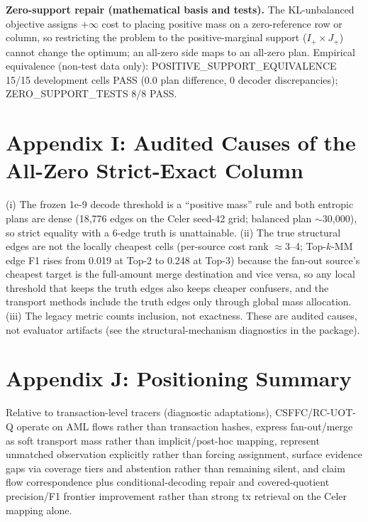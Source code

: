 \documentclass[journal]{IEEEtran}
\begin{document}
\textbf{Zero-support repair (mathematical basis and tests).} The KL-unbalanced objective assigns $+\infty$ cost to placing positive mass on a zero-reference row or column, so restricting the problem to the positive-marginal support ($I_+\times J_+$) cannot change the optimum; an all-zero side maps to an all-zero plan. Empirical equivalence (non-test data only): POSITIVE\_SUPPORT\_EQUIVALENCE 15/15 development cells PASS (0.0 plan difference, 0 decoder discrepancies); ZERO\_SUPPORT\_TESTS 8/8 PASS.

\section*{Appendix I: Audited Causes of the All-Zero Strict-Exact Column}

(i) The frozen 1e-9 decode threshold is a ``positive mass'' rule and both entropic plans are dense (18{,}776 edges on the Celer seed-42 grid; balanced plan $\sim$30{,}000), so strict equality with a 6-edge truth is unattainable. (ii) The true structural edges are not the locally cheapest cells (per-source cost rank $\approx$3--4; Top-$k$-MM edge F1 rises from 0.019 at Top-2 to 0.248 at Top-3) because the fan-out source's cheapest target is the full-amount merge destination and vice versa, so any local threshold that keeps the truth edges also keeps cheaper confusers, and the transport methods include the truth edges only through global mass allocation. (iii) The legacy metric counts inclusion, not exactness. These are audited causes, not evaluator artifacts (see the structural-mechanism diagnostics in the package).

\section*{Appendix J: Positioning Summary}

Relative to transaction-level tracers (diagnostic adaptations), CSFFC/RC-UOT-Q operate on AML flows rather than transaction hashes, express fan-out/merge as soft transport mass rather than implicit/post-hoc mapping, represent unmatched observation explicitly rather than forcing assignment, surface evidence gaps via coverage tiers and abstention rather than remaining silent, and claim flow correspondence plus conditional-decoding repair and covered-quotient precision/F1 frontier improvement rather than strong tx retrieval on the Celer mapping alone.
\end{document}
